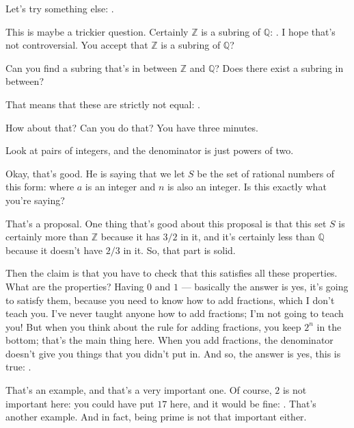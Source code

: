 \begin{speech}[00:41:44 - 00:42:37]
Let's try something else: .

This is maybe a trickier question. Certainly $\mathbb{Z}$ is a subring of $\mathbb{Q}$: . I hope that's not controversial. You accept that $\mathbb{Z}$ is a subring of $\mathbb{Q}$?

Can you find a subring that's in between $\mathbb{Z}$ and $\mathbb{Q}$? Does there exist a subring in between? 

That means that these are strictly not equal: .

How about that? Can you do that? You have three minutes.
\end{speech}

\begin{student}
Look at pairs of integers, and the denominator is just powers of two.
\end{student}

\begin{speech}[00:42:43 - 00:44:07]
Okay, that's good. He is saying that we let $S$ be the set of rational numbers of this form:  where $a$ is an integer and $n$ is also an integer. Is this exactly what you're saying?

That's a proposal. One thing that's good about this proposal is that this set $S$ is certainly more than $\mathbb{Z}$ because it has $3/2$ in it, and it's certainly less than $\mathbb{Q}$ because it doesn't have $2/3$ in it. So, that part is solid.

Then the claim is that you have to check that this satisfies all these properties. What are the properties? Having $0$ and $1$ --- basically the answer is yes, it's going to satisfy them, because you need to know how to add fractions, which I don't teach you. I've never taught anyone how to add fractions; I'm not going to teach you! But when you think about the rule for adding fractions, you keep $2^n$ in the bottom; that's the main thing here. When you add fractions, the denominator doesn't give you things that you didn't put in. And so, the answer is yes, this is true: .

That's an example, and that's a very important one. Of course, $2$ is not important here: you could have put $17$ here, and it would be fine: . That's another example. And in fact, being prime is not that important either.
\end{speech}

